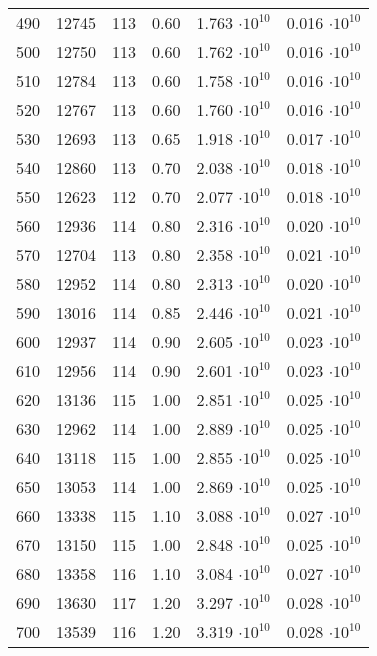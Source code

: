 \begin{table}[H]
\begin{tabular}{S S S S S S}
    490 & 12745 & 113 & 0.60 & 1.763 $\cdot10^{10}$ & 0.016 $\cdot10^{10}$ \\
    500 & 12750 & 113 & 0.60 & 1.762 $\cdot10^{10}$ & 0.016 $\cdot10^{10}$ \\
    510 & 12784 & 113 & 0.60 & 1.758 $\cdot10^{10}$ & 0.016 $\cdot10^{10}$ \\
    520 & 12767 & 113 & 0.60 & 1.760 $\cdot10^{10}$ & 0.016 $\cdot10^{10}$ \\
    530 & 12693 & 113 & 0.65 & 1.918 $\cdot10^{10}$ & 0.017 $\cdot10^{10}$ \\
    540 & 12860 & 113 & 0.70 & 2.038 $\cdot10^{10}$ & 0.018 $\cdot10^{10}$ \\
    550 & 12623 & 112 & 0.70 & 2.077 $\cdot10^{10}$ & 0.018 $\cdot10^{10}$ \\
    560 & 12936 & 114 & 0.80 & 2.316 $\cdot10^{10}$ & 0.020 $\cdot10^{10}$ \\
    570 & 12704 & 113 & 0.80 & 2.358 $\cdot10^{10}$ & 0.021 $\cdot10^{10}$ \\
    580 & 12952 & 114 & 0.80 & 2.313 $\cdot10^{10}$ & 0.020 $\cdot10^{10}$ \\
    590 & 13016 & 114 & 0.85 & 2.446 $\cdot10^{10}$ & 0.021 $\cdot10^{10}$ \\
    600 & 12937 & 114 & 0.90 & 2.605 $\cdot10^{10}$ & 0.023 $\cdot10^{10}$ \\
    610 & 12956 & 114 & 0.90 & 2.601 $\cdot10^{10}$ & 0.023 $\cdot10^{10}$ \\
    620 & 13136 & 115 & 1.00 & 2.851 $\cdot10^{10}$ & 0.025 $\cdot10^{10}$ \\
    630 & 12962 & 114 & 1.00 & 2.889 $\cdot10^{10}$ & 0.025 $\cdot10^{10}$ \\
    640 & 13118 & 115 & 1.00 & 2.855 $\cdot10^{10}$ & 0.025 $\cdot10^{10}$ \\
    650 & 13053 & 114 & 1.00 & 2.869 $\cdot10^{10}$ & 0.025 $\cdot10^{10}$ \\
    660 & 13338 & 115 & 1.10 & 3.088 $\cdot10^{10}$ & 0.027 $\cdot10^{10}$ \\
    670 & 13150 & 115 & 1.00 & 2.848 $\cdot10^{10}$ & 0.025 $\cdot10^{10}$ \\
    680 & 13358 & 116 & 1.10 & 3.084 $\cdot10^{10}$ & 0.027 $\cdot10^{10}$ \\
    690 & 13630 & 117 & 1.20 & 3.297 $\cdot10^{10}$ & 0.028 $\cdot10^{10}$ \\
    700 & 13539 & 116 & 1.20 & 3.319 $\cdot10^{10}$ & 0.028 $\cdot10^{10}$ \\



          \bottomrule
    \end{tabular}
  \end{table}
